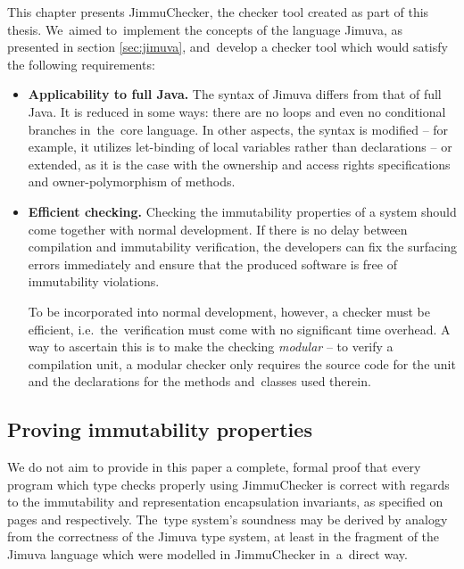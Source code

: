\documentclass{pracamgr}
\theoremstyle{break}
\theoremstyle{break}
\theoremstyle{break}
\begin{document}
This chapter presents JimmuChecker, the checker tool created as
part of this thesis. We~aimed to~implement the concepts of the
language Jimuva, as presented in section \ref{sec:jimuva}, and~develop
a checker tool which would satisfy the following requirements:
\begin{itemize}
\item \textbf{Applicability to full Java.} The syntax of Jimuva
  differs from that of full Java. It is reduced in some ways: there
  are no loops and even no conditional branches in~the~core
  language. In other aspects, the syntax is modified -- for example,
  it utilizes let-binding of local variables rather than declarations
  -- or extended, as it is the case with the ownership and access
  rights specifications and owner-polymorphism of methods.
\item \textbf{Efficient checking.} Checking the immutability
  properties of a system should come together with normal
  development. If there is no delay between compilation and
  immutability verification, the developers can fix the surfacing
  errors immediately and ensure that the produced software is free of
  immutability violations.

  To be incorporated into normal development, however, a checker must
  be efficient, i.e.~the~verification must come with no significant
  time overhead. A way to ascertain this is to make the checking
  \emph{modular} -- to verify a compilation unit, a modular checker
  only requires the source code for the unit and the declarations for
  the methods and~classes used therein.
\end{itemize}

\subsection{Proving immutability properties}

We do not aim to provide in this paper a complete, formal proof that
every program which type checks properly using JimmuChecker is
correct with regards to the immutability and representation
encapsulation invariants, as specified on pages \pageref{inv:open} and
\pageref{inv:encap} respectively. The~type system's soundness may be
derived by analogy from the correctness of the Jimuva type system, at
least in the fragment of the Jimuva language which were modelled in
JimmuChecker in~a~direct way.
\end{document}
